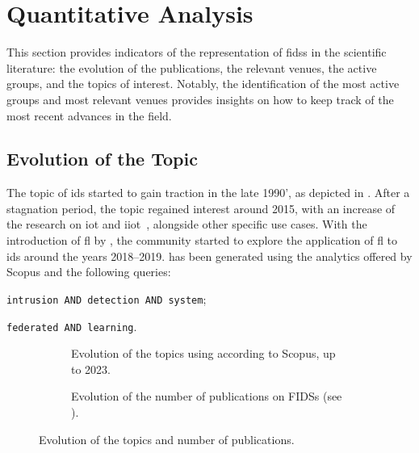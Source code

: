 \section{Quantitative Analysis\label{sec:sota.quanti}}

This section provides indicators of the representation of \glspl{fids} in the scientific literature: the evolution of the publications, the relevant venues, the active groups, and the topics of interest.
Notably, the identification of the most active groups and most relevant venues provides insights on how to keep track of the most recent advances in the field.

\subsection{Evolution of the Topic\label{sec:sota.quanti.time}}

The topic of \gls{ids} started to gain traction in the late 1990', as depicted in .
After a stagnation period, the topic regained interest around 2015, with an increase of the research on \gls{iot} and \gls{iiot}~\cite{doshi_MachineLearningDDoS_2018,chaabouni_NetworkIntrusionDetection_2019}, alongside other specific use cases.
With the introduction of \gls{fl} by \textcite{mcmahan_Communicationefficientlearningdeep_2017}, the community started to explore the application of \gls{fl} to \gls{ids} around the years 2018--2019.
 has been generated using the analytics offered by Scopus and the following queries: 
\begin{queries}
  \item \texttt{intrusion AND detection AND system}; \label{qry:ids}
  \item \texttt{federated AND learning}. \label{qry:fl}
\end{queries}

\begin{figure}
  \centering
  \begin{subfigure}{0.48\textwidth}
    \centering
    
    \caption{
      Evolution of the topics using  according to Scopus, up to 2023.
      \label{fig:sota.evol-topics}
    }
  \end{subfigure}
  \hfill
  \begin{subfigure}{0.48\textwidth}
    \centering
    
    \caption{
      Evolution of the number of publications on FIDSs (see ).
      \label{fig:sota.evol-fids}
    }
  \end{subfigure}
  \caption{
    Evolution of the topics and number of publications.
    \label{fig:sota.evol}
  }
\end{figure}

